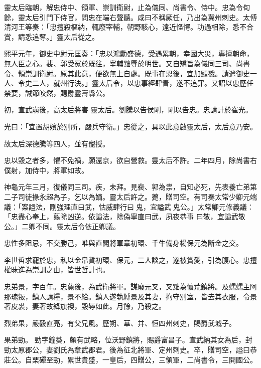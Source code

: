 \begin{pinyinscope}
 靈太后臨朝，解忠侍中、領軍、崇訓衛尉，止為儀同、尚書令、侍中。忠為令旬
 餘，靈太后引門下侍官，問忠在端右聲聽。咸曰不稱厥任，乃出為冀州刺史。太傅清河王等奏：「忠擅殺樞納，輒廢宰輔，朝野駭心，遠近怪愕。功過相除，悉不合賞，請悉追奪。」靈太后從之。



 熙平元年，御史中尉元匡奏：「忠以鴻勳盛德，受遇累朝，幸國大災，專擅朝命，無人臣之心。裴、郭受冤於既往，宰輔黜辱於明世。又自矯旨為儀同三司、尚書令、領崇訓衛尉。原其此意，便欲無上自處。既事在恩後，宜加顯戮。請遣御史一人、令史二人，就州行決。」靈太后令，以忠事經肆眚，遂不追罪。又詔以忠歷任禁要，誠節皎然，賜爵靈壽縣公。



 初，宣武崩後，高太后將害
 靈太后。劉騰以告侯剛，剛以告忠。忠請計於崔光。



 光曰：「宜置胡嬪於別所，嚴兵守衛。」忠從之，具以此意啟靈太后，太后意乃安。



 故太后深德騰等四人，並有寵授。



 忠以毀之者多，懼不免禍，願還京，欲自營救。靈太后不許。二年四月，除尚書右僕射，加侍中，將軍如故。



 神龜元年三月，復儀同三司。疾，未拜。見裴、郭為祟，自知必死，先表養亡弟第二子司徒掾永超為子，乞以為嫡。靈太后許之。薨，贈司空。有司奏太常少卿元端議：「案謚法，剛強理直曰武，怙威肆行曰鬼，宜謚武鬼公。」太常卿元修義議：「忠盡心奉上，翦除凶逆。依謚法，除偽寧直曰武，夙夜恭事
 曰敬，宜謚武敬公。」二卿不同。靈太后令依正卿議。



 忠性多阻忌，不交勝己，唯與直閣將軍章初環、千牛備身楊保元為斷金之交。



 李世哲求寵於忠，私以金帛貨初環、保元，二人談之，遂被賞愛，引為腹心。忠擅權昧進為崇訓之由，皆世哲計也。



 忠弟景，字百年。忠薨後，為武衛將軍。謀廢元叉，叉黜為懷荒鎮將。及蠕蠕主阿那瑰叛，鎮人請糧，景不給。鎮人遂執縛景及其妻，拘守別室，皆去其衣服，令景著皮裘，妻著故絳旗襖，毀辱如此。月餘，乃殺之。



 烈弟果，嚴毅直亮，有父兄風。歷朔、華、并、恒四州刺史，賜爵武城子。



 果弟勁。
 勁字鐘葵，頗有武略，位沃野鎮將，賜爵富昌子。宣武納其女為后，封勁太原郡公，妻劉氏為章武郡君。後為征北將軍、定州刺史。卒，贈司空，謚曰恭莊公。自栗磾至勁，累世貴盛，一皇后，四贈公，三領軍，二尚書令，三開國公。




\end{pinyinscope}

